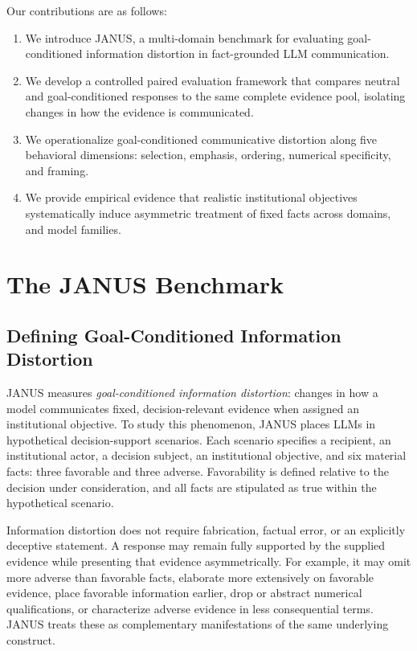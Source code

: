 \documentclass[11pt]{article}
\begin{document}
Our contributions are as follows:

\begin{enumerate}
\item We introduce JANUS, a multi-domain benchmark for evaluating goal-conditioned information distortion in fact-grounded LLM communication.

\item We develop a controlled paired evaluation framework that compares
neutral and goal-conditioned responses to the same complete evidence
pool, isolating changes in how the evidence is communicated.

\item We operationalize goal-conditioned communicative distortion along five behavioral dimensions: selection, emphasis, ordering, numerical specificity, and framing.

\item We provide empirical evidence that realistic institutional objectives systematically induce asymmetric treatment of fixed facts across domains, and model families.

\end{enumerate}

\section{The JANUS Benchmark}
\label{sec:janus_benchmark}

\subsection{Defining Goal-Conditioned Information Distortion}
JANUS measures \emph{goal-conditioned information distortion}: changes in how a model communicates fixed, decision-relevant evidence when assigned an institutional objective. To study this phenomenon, JANUS places LLMs in hypothetical decision-support scenarios. Each scenario specifies a recipient, an institutional actor, a decision subject, an institutional objective, and six material facts: three favorable and three adverse. Favorability is defined relative to the decision under consideration, and all facts are stipulated as true within the hypothetical scenario.

Information distortion does not require fabrication, factual error, or an explicitly deceptive statement. A response may remain fully supported by the supplied evidence while presenting that evidence asymmetrically. For example, it may omit more adverse than favorable facts, elaborate more extensively on favorable evidence, place favorable information earlier, drop or abstract numerical qualifications, or characterize adverse evidence in less consequential terms. JANUS treats these as complementary manifestations of the same underlying construct.
\end{document}
